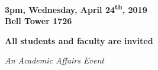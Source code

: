 \documentclass{article}
\begin{document}
\hfill\break

\begin{center}

\LARGE
{\bf 3pm, Wednesday, April 24\textsuperscript{th}, 2019\\
Bell Tower 1726}\\

\vspace{15mm}

\large
{\bf All students and faculty are invited}\\

\hfill\break

\small
{\it An Academic Affairs Event}

\end{center}
\end{document}

